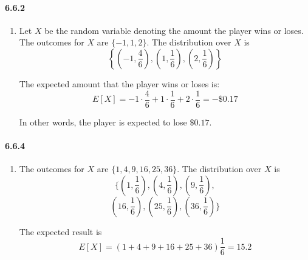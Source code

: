 \documentclass[11pt, letterpaper, twocolumn, fleqn]{article}
\begin{document}
\paragraph{6.6.2}
\begin{enumerate}
  \item Let $X$ be the random variable denoting the amount the player wins or loses. The outcomes for $X$ are $\{-1,1,2\}$. The distribution over $X$ is 
    $$\left\{
      \left(-1,\frac{4}{6}\right),
      \left(1,\frac{1}{6}\right),
      \left(2 ,\frac{1}{6}\right)
    \right\}$$
    
  The expected amount that the player wins or loses is:
    $$E[X] = -1\cdot\frac{4}{6} + 1\cdot\frac{1}{6} + 2\cdot\frac{1}{6} = -\$0.17$$
    
  In other words, the player is expected to lose $\$0.17$.
\end{enumerate}

\paragraph{6.6.4}
\begin{enumerate}
  \item The outcomes for $X$ are $\{1,4,9,16,25,36\}$. The distribution over $X$ is 
    $$\bigg\{
      \left(1 ,\frac{1}{6}\right),
      \left(4 ,\frac{1}{6}\right),
      \left(9 ,\frac{1}{6}\right),$$
    $$\left(16,\frac{1}{6}\right),
      \left(25,\frac{1}{6}\right),
      \left(36,\frac{1}{6}\right)
    \bigg\}$$
    
  The expected result is 
    $$E[X] = (1 + 4 + 9 + 16 + 25 + 36)\frac{1}{6} = 15.2$$
\end{enumerate}
\end{document}
